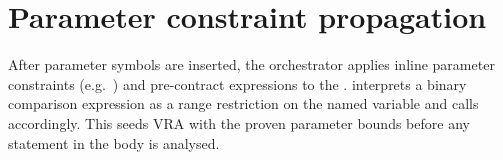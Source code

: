 \section{Parameter constraint propagation}
\label{sec:tc-constraints}

\pnum
After parameter symbols are inserted, the orchestrator applies inline parameter
constraints (e.g.\ ) and pre-contract expressions to the
.   interprets a
binary comparison expression as a range restriction on the named variable and
calls  accordingly.  This seeds VRA with the proven parameter
bounds before any statement in the body is analysed.
